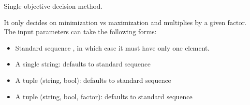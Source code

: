 \documentclass[letterpaper,10pt,english]{sphinxmanual}
\begin{document}
\begin{fulllineitems}
\label{\detokenize{api:muse.decisions.single_objective}}
Single objective decision method.

It only decides on minimization vs maximization and multiplies by a given factor.
The input parameters can take the following forms:
\begin{itemize}
\item {} 
Standard sequence , in which case it must have
only one element.

\item {} 
A single string: defaults to standard sequence \sphinxtitleref{{[}(string, 1, 1){]}}

\item {} 
A tuple (string, bool): defaults to standard sequence

\item {} 
A tuple (string, bool, factor): defaults to standard sequence

\end{itemize}

\end{fulllineitems}

\end{document}
